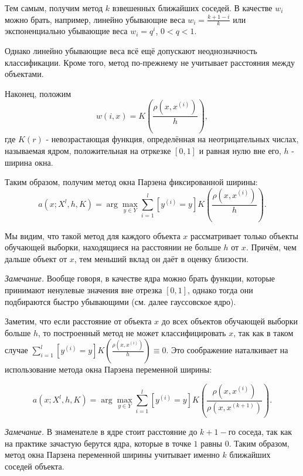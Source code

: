 Тем самым, получим метод $k$ взвешенных ближайших соседей. В качестве $w_i$ можно брать, например, линейно убывающие веса $\displaystyle w_i = \frac{k+1-i}{k}$ или экспоненциально убывающие веса $w_i = q^i$, $0 < q < 1$.

Однако линейно убывающие веса всё ещё допускают неоднозначность классификации. Кроме того, метод по-прежнему не учитывает расстояния между объектами. 

Наконец, положим
\begin{equation*}
    \displaystyle w(i,x) = K\left(\frac{\rho(x, x^{(i)})}{h}\right),
\end{equation*}
где $K(r)$ - невозрастающая функция, определённая на неотрицательных числах, называемая ядром, положительная на отркезке $[0,1]$ и равная нулю вне его, $h$ - ширина окна. 

Таким образом, получим метод окна Парзена фиксированной ширины:
\begin{equation*}
    \displaystyle a(x; X^l, h, K) = \arg\max_{y\in Y} \sum\limits_{i=1}^l[y^{(i)}=y]K\left(\frac{\rho(x, x^{(i)})}{h}\right). 
\end{equation*}

Мы видим, что такой метод для каждого объекта $x$ рассматривает только объекты обучающей выборки, находящиеся на расстоянии не больше $h$ от $x$. Причём, чем дальше объект от $x$, тем  меньший вклад он даёт в оценку близости.

\textit{Замечание.} Вообще говоря, в качестве ядра можно брать функции, которые принимают ненулевые значения вне отрезка $[0,1]$, однако тогда они подбираются быстро убывающими (см. далее гауссовское ядро).

Заметим, что если расстояние от объекта $x$ до всех объектов обучающей выборки больше $h$, то построенный метод не может классифицировать $x$, так как в таком случае $\displaystyle\sum\limits_{i=1}^l[y^{(i)}=y]K\left(\frac{\rho(x, x^{(i)})}{h}\right) \equiv 0$. Это соображение наталкивает на использование метода окна Парзена переменной ширины:

\begin{equation*}
    \displaystyle a(x; X^l, h, K) = \arg\max_{y\in Y} \sum\limits_{i=1}^l[y^{(i)}=y]K\left(\frac{\rho(x, x^{(i)})}{\rho(x, x^{(k+1)})}\right). 
\end{equation*}

\textit{Замечание.} В знаменателе в ядре стоит расстояние до $k+1-$го соседа, так как на практике зачастую берутся ядра, которые в точке $1$ равны $0$. Таким образом, метод окна Парзена переменной ширины учитывает именно $k$ ближайших соседей объекта.

